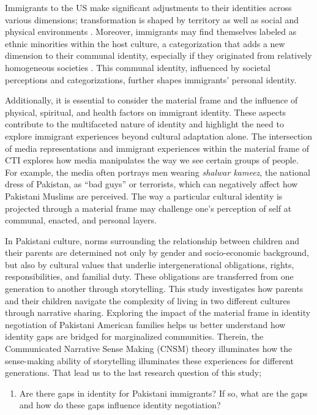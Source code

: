 Immigrants to the US make significant adjustments to their identities across various dimensions; transformation is shaped by territory as well as social and physical environments \citep{kuiperCommunicationTheoryIdentity2021}. Moreover, immigrants may find themselves labeled as ethnic minorities within the host culture, a categorization that adds a new dimension to their communal identity, especially if they originated from relatively homogeneous societies \citep{shinCommunicationTheoryIdentity2017}. This communal identity, influenced by societal perceptions and categorizations, further shapes immigrants' personal identity. 

Additionally, it is essential to consider the material frame and the influence of physical, spiritual, and health factors on immigrant identity. These aspects contribute to the multifaceted nature of identity and highlight the need to explore immigrant experiences beyond cultural adaptation alone. The intersection of media representations and immigrant experiences within the material frame of CTI explores how media manipulates the way we see certain groups of people. For example, the media often portrays men wearing \emph{shalwar kameez}, the national dress of Pakistan, as ``bad guys'' or terrorists, which can negatively affect how Pakistani Muslims are perceived. The way a particular cultural identity is projected through a material frame may challenge one's perception of self at communal, enacted, and personal layers. 

In Pakistani culture, norms surrounding the relationship between children and their parents are determined not only by gender and socio-economic background, but also by cultural values that underlie intergenerational obligations, rights, responsibilities, and familial duty. These obligations are transferred from one generation to another through storytelling. This study investigates how parents and their children navigate the complexity of living in two different cultures through narrative sharing. Exploring the impact of the material frame in identity negotiation of Pakistani American families helps us better understand how identity gaps are bridged for marginalized communities. Therein, the Communicated Narrative Sense Making (CNSM) theory illuminates how the sense-making ability of storytelling illuminates these experiences for different generations.  That lead us to the last research question of this study;

\begin{enumerate}
    \item[4. ] Are there gaps in identity for Pakistani immigrants? If so, what are the gaps and how do these gaps influence identity negotiation?
\end{enumerate}

